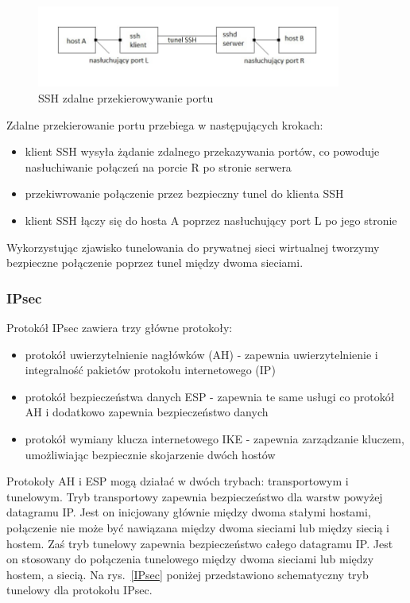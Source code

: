 \documentclass[12p]{article}
\begin{document}
\begin{figure}[h]
\centering
\includegraphics[width=10cm]{przekierowywanie_zdalne_SSH.jpg}
\caption{SSH zdalne przekierowywanie portu}\label{SSH_1}
\end{figure}

Zdalne przekierowanie portu przebiega w następujących krokach:
\begin{itemize}
\item klient SSH wysyła żądanie zdalnego przekazywania portów, co powoduje nasłuchiwanie połączeń na porcie R po stronie serwera
\item przekiwrowanie połączenie przez bezpieczny tunel do klienta SSH
\item klient SSH łączy się do hosta A poprzez nasłuchujący port L po jego stronie
\end{itemize}
\quad 
Wykorzystując zjawisko tunelowania do prywatnej sieci wirtualnej tworzymy bezpieczne połączenie poprzez tunel między dwoma sieciami. ~\cite{SSH}

\subsubsection{IPsec}
\quad Protokół IPsec zawiera trzy główne protokoły:
\begin{itemize}
\item protokół uwierzytelnienie nagłówków (AH) - zapewnia uwierzytelnienie i integralność pakietów protokołu internetowego (IP)
\item  protokół bezpieczeństwa danych ESP - zapewnia te same usługi co protokół AH i dodatkowo zapewnia bezpieczeństwo danych
\item protokół wymiany klucza internetowego IKE - zapewnia zarządzanie kluczem, umożliwiając bezpiecznie skojarzenie dwóch hostów 
\end{itemize}
\quad Protokoły AH i ESP mogą działać w dwóch trybach: transportowym i tunelowym. Tryb transportowy zapewnia bezpieczeństwo dla warstw powyżej datagramu IP. Jest on inicjowany głównie między dwoma stałymi hostami, połączenie nie może być nawiązana między dwoma sieciami lub między siecią i hostem. Zaś tryb tunelowy zapewnia bezpieczeństwo całego datagramu IP. Jest on stosowany do połączenia tunelowego między dwoma sieciami lub między hostem, a siecią. Na rys.~\ref{IPsec} poniżej przedstawiono schematyczny tryb tunelowy dla protokołu IPsec.
\end{document}

